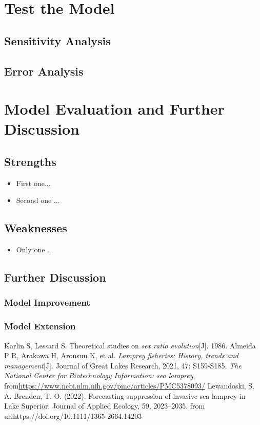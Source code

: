 \documentclass[12pt]{article}  %
\begin{document}
\section{Test the Model}

\subsection{Sensitivity Analysis}

\subsection{Error Analysis}


\section{Model Evaluation and Further Discussion}
\subsection{Strengths}
\begin{itemize}
    \item First one...
    \item Second one ...
\end{itemize}

\subsection{Weaknesses}
\begin{itemize}
    \item Only one ...
 \end{itemize}
 
 \subsection{Further Discussion}
 
 \subsubsection{Model Improvement}
 
 \subsubsection{Model Extension}


\newpage

\begin{thebibliography}{99}
 Karlin S, Lessard S. Theoretical studies on \emph{sex ratio evolution}[J]. 1986.
 Almeida P R, Arakawa H, Aronsuu K, et al. \emph{Lamprey fisheries: History, trends and management}[J]. Journal of Great Lakes Research, 2021, 47: S159-S185.
 \emph{The National Center for Biotechnology Information: sea lamprey}, from\url{https://www.ncbi.nlm.nih.gov/pmc/articles/PMC5378093/}
 Lewandoski, S. A. Brenden, T. O. (2022). Forecasting suppression of invasive sea lamprey in Lake Superior. Journal of Applied Ecology, 59, 2023–2035. from url{https://doi.org/10.1111/1365-2664.14203}
\end{thebibliography}
\end{document}
